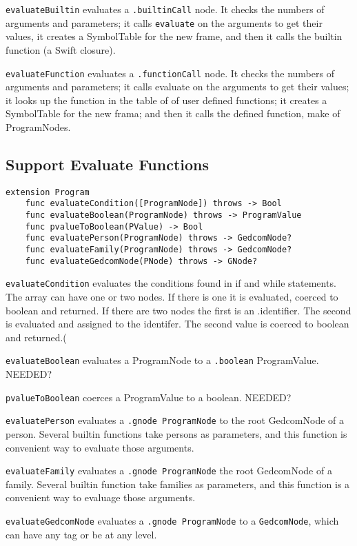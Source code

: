 \texttt{evaluateBuiltin} evaluates a \texttt{.builtinCall} node.
It checks the numbers of arguments and parameters; it calls
\texttt{evaluate} on the arguments to get their values, it creates a
SymbolTable for the new frame, and then
it calls the builtin function (a Swift closure).

\texttt{evaluateFunction} evaluates a \texttt{.functionCall} node.
It checks the numbers of arguments and parameters; it calls
evaluate on the arguments to get their values; it looks up the
function in the table of of user defined functions; it creates a
SymbolTable for the new frama; and then it calls the defined function, make
of ProgramNodes.

\subsection{Support Evaluate Functions}

\begin{verbatim}
extension Program
    func evaluateCondition([ProgramNode]) throws -> Bool
    func evaluateBoolean(ProgramNode) throws -> ProgramValue
    func pvalueToBoolean(PValue) -> Bool
    func evaluatePerson(ProgramNode) throws -> GedcomNode?
    func evaluateFamily(ProgramNode) throws -> GedcomNode?
    func evaluateGedcomNode(PNode) throws -> GNode?
\end{verbatim}

\texttt{evaluateCondition} evaluates the conditions found in if
and while statements. The array can have one or two nodes. If there
is one it is evaluated, coerced to boolean and returned.
If there are two nodes the first is an .identifier. The second is
evaluated and assigned to the identifer. The second value is coerced
to boolean and returned.(

\texttt{evaluateBoolean} evaluates a ProgramNode to a \texttt{.boolean}
ProgramValue. NEEDED?

\texttt{pvalueToBoolean} coerces a ProgramValue to a boolean. NEEDED?

\texttt{evaluatePerson} evaluates a \texttt{.gnode ProgramNode} to the root
GedcomNode of a person. Several builtin functions take persons as
parameters, and this function is convenient way to evaluate those
arguments.

\texttt{evaluateFamily} evaluates a \texttt{.gnode ProgramNode} the
root GedcomNode of a family. Several builtin function take families
as parameters, and this function is a convenient way to evaluage those
arguments.

\texttt{evaluateGedcomNode} evaluates a \texttt{.gnode ProgramNode} to a
\texttt{GedcomNode}, which can have any tag or be at any level.
